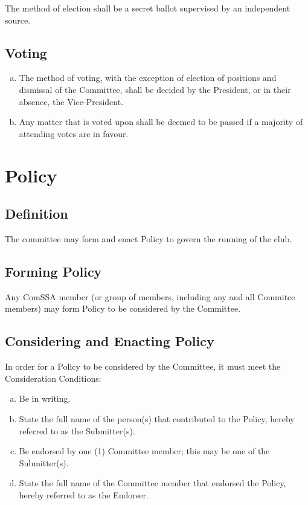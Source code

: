 \documentclass[a4paper,12pt]{article}
\begin{document}
The method of election shall be a secret ballot supervised by an independent source.

\subsection{Voting}

\begin{enumerate}[a)]
	\item The method of voting, with the exception of election of positions and dismissal of the Committee, shall be decided by the President, or in their absence, the Vice-President.
	\item Any matter that is voted upon shall be deemed to be passed if a majority of attending votes are in favour.
\end{enumerate}

\section{Policy}

\subsection{Definition}

The committee may form and enact Policy to govern the running of the club.

\subsection{Forming Policy}

Any ComSSA member (or group of members, including any and all Commitee members) may form Policy to be considered by the Committee.

\subsection{Considering and Enacting Policy}

In order for a Policy to be considered by the Committee, it must meet the Consideration Conditions:

\begin{enumerate}[a)]
    \item Be in writing.
    \item State the full name of the person(s) that contributed to the Policy, hereby referred to as the Submitter(s).
    \item Be endorsed by one (1) Committee member; this may be one of the Submitter(s).
    \item State the full name of the Committee member that endorsed the Policy, hereby referred to as the Endorser.
\end{enumerate}
\end{document}
